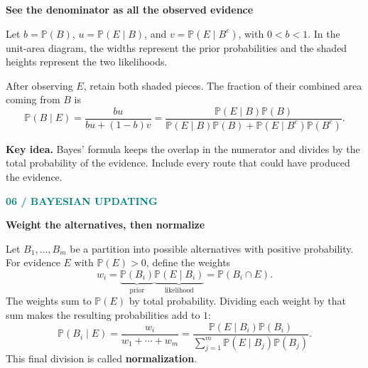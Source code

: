 \documentclass[11pt,letterpaper]{article}
\newcommand{\Pp}{\mathbb{P}}
\newcommand{\sectionpage}[2]{\textcolor{teal}{\small\textbf{#1}}\par{\LARGE\bfseries\color{ink}#2}\par\medskip}
\newcommand{\takeaway}[1]{\par\smallskip\noindent\colorbox{pale}{\parbox{\dimexpr\linewidth-2\fboxsep\relax}{\textbf{Key idea.} #1}}\par\smallskip}
\newcommand{\minihead}[1]{\par\smallskip\textbf{\color{ink}#1}\par}
\begin{document}
\minihead{See the denominator as all the observed evidence}
Let $b=\Pp(B)$, $u=\Pp(E\mid B)$, and $v=\Pp(E\mid B^c)$, with $0<b<1$. In the unit-area diagram, the widths represent the prior probabilities and the shaded heights represent the two likelihoods.
\begin{center}
\end{center}
After observing $E$, retain both shaded pieces. The fraction of their combined area coming from $B$ is
\[
\Pp(B\mid E)=\frac{bu}{bu+(1-b)v}
=\frac{\Pp(E\mid B)\Pp(B)}{\Pp(E\mid B)\Pp(B)+\Pp(E\mid B^c)\Pp(B^c)}.
\]
\takeaway{Bayes' formula keeps the overlap in the numerator and divides by the total probability of the evidence. Include every route that could have produced the evidence.}

\newpage
\sectionpage{06 / BAYESIAN UPDATING}{Weight the alternatives, then normalize}
Let $B_1,\ldots,B_m$ be a partition into possible alternatives with positive probability. For evidence $E$ with $\Pp(E)>0$, define the weights
\[
w_i=\underbrace{\Pp(B_i)}_{\text{prior}}\underbrace{\Pp(E\mid B_i)}_{\text{likelihood}}
=\Pp(B_i\cap E).
\]
The weights sum to $\Pp(E)$ by total probability. Dividing each weight by that sum makes the resulting probabilities add to $1$:
\[
\boxed{\Pp(B_i\mid E)=\frac{w_i}{w_1+\cdots+w_m}
=\frac{\Pp(E\mid B_i)\Pp(B_i)}{\sum_{j=1}^{m}\Pp(E\mid B_j)\Pp(B_j)}.}
\]
This final division is called \textbf{normalization}.
\end{document}
